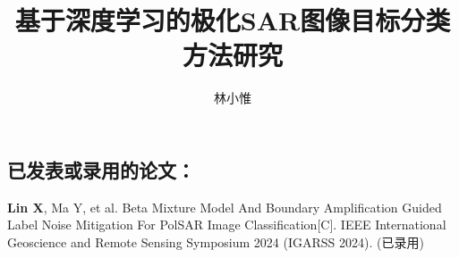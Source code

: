 \documentclass[promaster]{thesis-uestc}
\title{基于深度学习的极化SAR图像目标分类方法研究}{Research on Target Classification Method of Polarimetric SAR Images Based on Deep Learning}
\author{林小惟}{Lin Xiaowei}
\begin{document}
\makecover





\thesistableofcontents








% 



%
% 
%


%

% 
% 

\begin{thesistheaccomplish}
    \section*{已发表或录用的论文：}
     \textbf{Lin X}, Ma Y, et al. Beta Mixture Model And Boundary Amplification Guided Label Noise Mitigation For PolSAR Image Classification[C]. IEEE International Geoscience and Remote Sensing Symposium 2024 (IGARSS 2024). (已录用)

\end{thesistheaccomplish}

\end{document}
